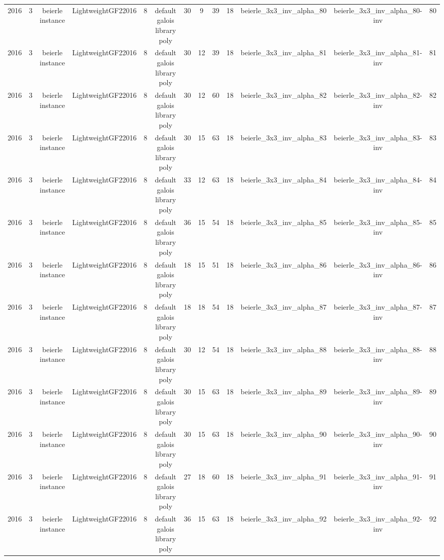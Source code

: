 \begin{tabular}{c c c c c c c c c c c c c}
2016 & 3 & beierle instance & LightweightGF22016 & 8 & default galois library poly & 30 & 9 & 39 & 18 & beierle_3x3_inv_alpha_80 & beierle_3x3_inv_alpha_80-inv & 80 \\
2016 & 3 & beierle instance & LightweightGF22016 & 8 & default galois library poly & 30 & 12 & 39 & 18 & beierle_3x3_inv_alpha_81 & beierle_3x3_inv_alpha_81-inv & 81 \\
2016 & 3 & beierle instance & LightweightGF22016 & 8 & default galois library poly & 30 & 12 & 60 & 18 & beierle_3x3_inv_alpha_82 & beierle_3x3_inv_alpha_82-inv & 82 \\
2016 & 3 & beierle instance & LightweightGF22016 & 8 & default galois library poly & 30 & 15 & 63 & 18 & beierle_3x3_inv_alpha_83 & beierle_3x3_inv_alpha_83-inv & 83 \\
2016 & 3 & beierle instance & LightweightGF22016 & 8 & default galois library poly & 33 & 12 & 63 & 18 & beierle_3x3_inv_alpha_84 & beierle_3x3_inv_alpha_84-inv & 84 \\
2016 & 3 & beierle instance & LightweightGF22016 & 8 & default galois library poly & 36 & 15 & 54 & 18 & beierle_3x3_inv_alpha_85 & beierle_3x3_inv_alpha_85-inv & 85 \\
2016 & 3 & beierle instance & LightweightGF22016 & 8 & default galois library poly & 18 & 15 & 51 & 18 & beierle_3x3_inv_alpha_86 & beierle_3x3_inv_alpha_86-inv & 86 \\
2016 & 3 & beierle instance & LightweightGF22016 & 8 & default galois library poly & 18 & 18 & 54 & 18 & beierle_3x3_inv_alpha_87 & beierle_3x3_inv_alpha_87-inv & 87 \\
2016 & 3 & beierle instance & LightweightGF22016 & 8 & default galois library poly & 30 & 12 & 54 & 18 & beierle_3x3_inv_alpha_88 & beierle_3x3_inv_alpha_88-inv & 88 \\
2016 & 3 & beierle instance & LightweightGF22016 & 8 & default galois library poly & 30 & 15 & 63 & 18 & beierle_3x3_inv_alpha_89 & beierle_3x3_inv_alpha_89-inv & 89 \\
2016 & 3 & beierle instance & LightweightGF22016 & 8 & default galois library poly & 30 & 15 & 63 & 18 & beierle_3x3_inv_alpha_90 & beierle_3x3_inv_alpha_90-inv & 90 \\
2016 & 3 & beierle instance & LightweightGF22016 & 8 & default galois library poly & 27 & 18 & 60 & 18 & beierle_3x3_inv_alpha_91 & beierle_3x3_inv_alpha_91-inv & 91 \\
2016 & 3 & beierle instance & LightweightGF22016 & 8 & default galois library poly & 36 & 15 & 63 & 18 & beierle_3x3_inv_alpha_92 & beierle_3x3_inv_alpha_92-inv & 92 \\

\end{tabular}

